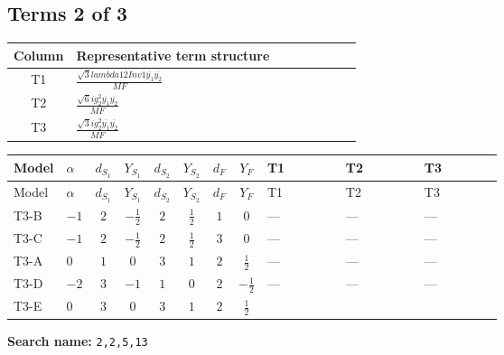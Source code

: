\documentclass[8pt]{article}
\begin{document}
\begin{landscape}
\subsection*{Terms 2 of 3}
\begin{center}
\begin{tabular}{@{}c >{\raggedright\arraybackslash}p{0.82\linewidth}@{}}
\toprule
Column & Representative term structure \\
\midrule
T1 & \(\displaystyle \frac{\sqrt{3} lambda12Inv1 \overline{y_{1}} \overline{y_{2}}}{MF}\) \\
\midrule
T2 & \(\displaystyle \frac{\sqrt{6} i g_{2}^{2} \overline{y_{1}} \overline{y_{2}}}{MF}\) \\
\midrule
T3 & \(\displaystyle \frac{\sqrt{3} i g_{2}^{2} \overline{y_{1}} \overline{y_{2}}}{MF}\) \\
\midrule
\bottomrule
\end{tabular}
\end{center}
\smallskip
\tiny
\begin{longtable}{@{}llcccccc >{\raggedright\arraybackslash}p{0.21\linewidth} >{\raggedright\arraybackslash}p{0.21\linewidth} >{\raggedright\arraybackslash}p{0.21\linewidth}@{}}
\toprule
Model & $\alpha$ & $d_{S_1}$ & $Y_{S_1}$ & $d_{S_2}$ & $Y_{S_2}$ & $d_F$ & $Y_F$ & T1 & T2 & T3 \\
\midrule
\endfirsthead
\toprule
Model & $\alpha$ & $d_{S_1}$ & $Y_{S_1}$ & $d_{S_2}$ & $Y_{S_2}$ & $d_F$ & $Y_F$ & T1 & T2 & T3 \\
\midrule
\endhead
T3-B & $-1$ & $2$ & $-\frac{1}{2}$ & $2$ & $\frac{1}{2}$ & $1$ & $0$ & --- & --- & --- \\
\midrule
T3-C & $-1$ & $2$ & $-\frac{1}{2}$ & $2$ & $\frac{1}{2}$ & $3$ & $0$ & --- & --- & --- \\
\midrule
T3-A & $0$ & $1$ & $0$ & $3$ & $1$ & $2$ & $\frac{1}{2}$ & --- & --- & --- \\
\midrule
T3-D & $-2$ & $3$ & $-1$ & $1$ & $0$ & $2$ & $-\frac{1}{2}$ & --- & --- & --- \\
\midrule
T3-E & $0$ & $3$ & $0$ & $3$ & $1$ & $2$ & $\frac{1}{2}$ & \scriptsize\adjustbox{max width=\linewidth}{$\begin{gathered} \frac{\sqrt{3} lambda12Inv1 \overline{y_{1}} \overline{y_{2}}}{6 MF}\end{gathered}$} & \scriptsize\adjustbox{max width=\linewidth}{$\begin{gathered} \frac{\sqrt{6} i g_{2}^{2} \overline{y_{1}} \overline{y_{2}}}{3 MF}\end{gathered}$} & \scriptsize\adjustbox{max width=\linewidth}{$\begin{gathered} \frac{\sqrt{3} i g_{2}^{2} \overline{y_{1}} \overline{y_{2}}}{6 MF}\end{gathered}$} \\
\midrule
\bottomrule
\end{longtable}
\clearpage
\noindent\textbf{Search name: }\texttt{2,2,5,13}\par\smallskip

\end{landscape}
\end{document}
